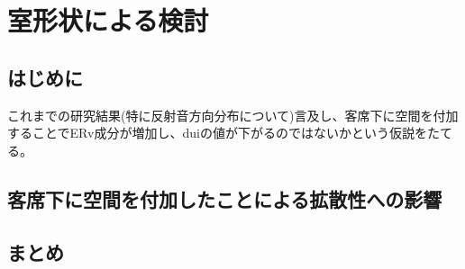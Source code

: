 \chapter{室形状による検討}
\section{はじめに}
これまでの研究結果(特に反射音方向分布について)言及し、客席下に空間を付加することでERv成分が増加し、duiの値が下がるのではないかという仮説をたてる。
\section{客席下に空間を付加したことによる拡散性への影響}
\section{まとめ}